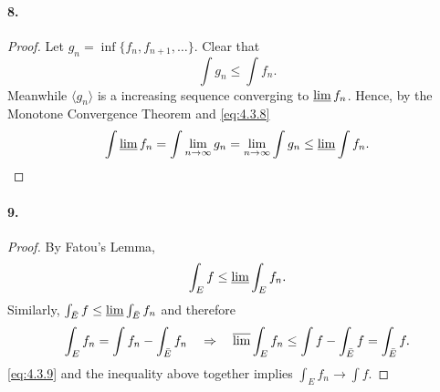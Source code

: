   \paragraph{8.}
  \begin{proof}
    Let $g_n = \inf\{f_n,f_{n+1},\dots\}$. Clear that 
    \begin{equation}
      \label{eq:4.3.8}
      \int g_n \le \int f_n.
    \end{equation}
    Meanwhile $\langle g_n\rangle$ is a increasing sequence converging to 
    $\operatorname*{\underline{lim}} f_n$. Hence, by the Monotone Convergence Theorem and 
    \eqref{eq:4.3.8}
    \[
      \int \operatorname*{\underline{lim}} f_n = \int \lim_{n\to\infty}g_n = 
      \lim_{n\to\infty}\int g_n \le \operatorname*{\underline{lim}}\int f_n.
    \]
  \end{proof}

  \paragraph{9.}
  \begin{proof}
    By Fatou's Lemma,
    \begin{equation}
      \label{eq:4.3.9}
      \int_E f \le \operatorname*{\underline{lim}}\int_E f_n.
    \end{equation}
    Similarly, $\int_{\bar{E}}f \le \operatorname*{\underline{lim}}\int_{\bar{E}} f_n$ and therefore
    \[
      \int_E f_n = \int f_n-\int_{\bar{E}} f_n\quad\Rightarrow\quad
      \operatorname*{\overline{lim}}\int_E f_n \le \int f- \int_{\bar{E}} f = \int_{\bar{E}} f.
    \]
    \eqref{eq:4.3.9} and the inequality above together implies $\int_E f_n\to
    \int f$.
  \end{proof}

